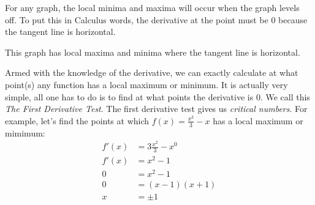 \documentclass[../revisedmain.tex]{subfiles}
\begin{document}
	 For any graph, the local minima and maxima will occur when the graph levels off. To put this in Calculus words, the derivative at the point must be 0 because the tangent line is horizontal.
	 \begin{center}
	 	\newline This graph has local maxima and minima where the tangent line is horizontal.
	 \end{center} 
	 Armed with the knowledge of the derivative, we can exactly calculate at what point(s) any function has a local maximum or minimum. It is actually very simple, all one has to do is to find at what points the derivative is 0. We call this \textit{The First Derivative Test}. The first derivative test gives us \textit{critical numbers}. For example, let's find the points at which $f(x)=\displaystyle\frac{x^3}{3}-x$ has a local maximum or mimimum:
	 \begin{equation}
	 \begin{split}
	 f'(x)&=3\frac{x^2}{3}-x^0 \\
	 f'(x)&=x^2-1 \\
	 0 &= x^2-1 \\
	 0 &= (x-1)(x+1) \\
	 x&=\pm 1
	 \end{split}
	 \end{equation}
\end{document}
